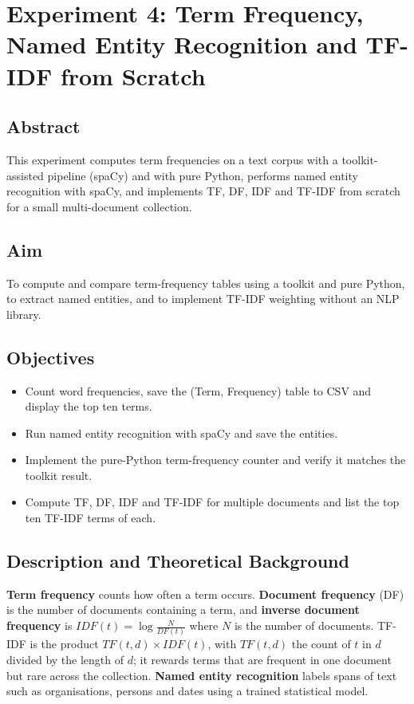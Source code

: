 \documentclass[12pt,a4paper,oneside]{report}
\begin{document}
\chapter{Experiment 4: Term Frequency, Named Entity Recognition and TF-IDF from Scratch}
\section{Abstract}
This experiment computes term frequencies on a text corpus with a toolkit-assisted pipeline (spaCy) and with pure Python, performs named entity recognition with spaCy, and implements TF, DF, IDF and TF-IDF from scratch for a small multi-document collection.


\section{Aim}
To compute and compare term-frequency tables using a toolkit and pure Python, to extract named entities, and to implement TF-IDF weighting without an NLP library.


\section{Objectives}
\begin{itemize}
\item Count word frequencies, save the (Term, Frequency) table to CSV and display the top ten terms.
\item Run named entity recognition with spaCy and save the entities.
\item Implement the pure-Python term-frequency counter and verify it matches the toolkit result.
\item Compute TF, DF, IDF and TF-IDF for multiple documents and list the top ten TF-IDF terms of each.
\end{itemize}

\section{Description and Theoretical Background}
\textbf{Term frequency} counts how often a term occurs. \textbf{Document frequency} (DF) is the number of documents containing a term, and \textbf{inverse document frequency} is \(IDF(t)=\log\frac{N}{DF(t)}\) where \(N\) is the number of documents. TF-IDF is the product \(TF(t,d)\times IDF(t)\), with \(TF(t,d)\) the count of \(t\) in \(d\) divided by the length of \(d\); it rewards terms that are frequent in one document but rare across the collection. \textbf{Named entity recognition} labels spans of text such as organisations, persons and dates using a trained statistical model.
\end{document}
